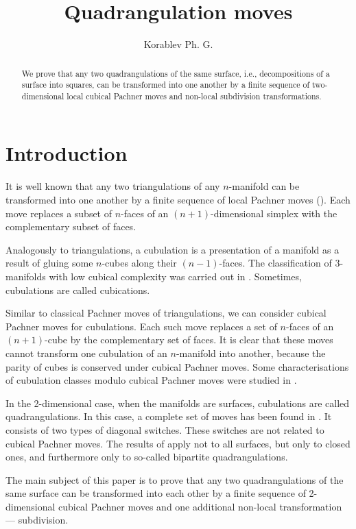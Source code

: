 \documentclass{amsart}
\title{Quadrangulation moves}
\author{Korablev Ph. G.}
\date{}
\begin{document}
\begin{abstract}
    We prove that any two quadrangulations of the same surface, i.e., decompositions of a surface into squares, can be transformed into one another by a finite sequence of two-dimensional local cubical Pachner moves and non-local subdivision transformations.
\end{abstract}

\maketitle

\section{Introduction}

It is well known that any two triangulations of any $n$-manifold can be transformed into one another by a finite sequence of local Pachner moves (\cite{FH,L,P,RST}). Each move replaces a subset of $n$-faces of an $(n+1)$-dimensional simplex with the complementary subset of faces.

Analogously to triangulations, a cubulation is a presentation of a manifold as a result of gluing some $n$-cubes along their $(n-1)$-faces. The classification of 3-manifolds with low cubical complexity was carried out in \cite{A1,A2,KK}. Sometimes, cubulations are called cubications.

Similar to classical Pachner moves of triangulations, we can consider cubical Pachner moves for cubulations. Each such move replaces a set of $n$-faces of an $(n+1)$-cube by the complementary set of faces. It is clear that these moves cannot transform one cubulation of an $n$-manifold into another, because the parity of cubes is conserved under cubical Pachner moves. Some characterisations of cubulation classes modulo cubical Pachner moves were studied in \cite{F1,F2}.

In the 2-dimensional case, when the manifolds are surfaces, cubulations are called quadrangulations. In this case, a complete set of moves has been found in \cite{N}. It consists of two types of diagonal switches. These switches are not related to cubical Pachner moves. The results of \cite{N} apply not to all surfaces, but only to closed ones, and furthermore only to so-called bipartite quadrangulations.

The main subject of this paper is to prove that any two quadrangulations of the same surface can be transformed into each other by a finite sequence of 2-dimensional cubical Pachner moves and one additional non-local transformation --- subdivision.
\end{document}
